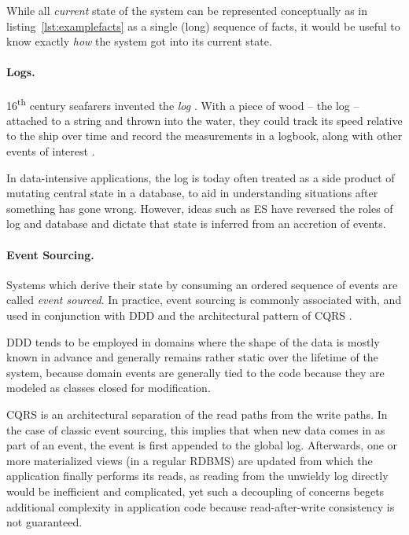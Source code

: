 While all \emph{current} state of the system can be represented conceptually as in listing~\ref{lst:examplefacts} as a single (long) sequence of facts, it would be useful to know exactly \emph{how} the system got into its current state.


\paragraph{Logs.} 16\textsuperscript{th} century seafarers invented the \emph{log} \cite{may1973historylog}. With a piece of wood -- the log -- attached to a string and thrown into the water, they could track its speed relative to the ship over time and record the measurements in a logbook, along with other events of interest \cite{kakkar19log}.

In data-intensive applications, the log is today often treated as a side product of mutating central state in a database, to aid in understanding situations after something has gone wrong. However, ideas such as \gls{ES} have reversed the roles of log and database and dictate that state is inferred from an accretion of events.

\cleardoublepage
\paragraph{Event Sourcing.} Systems which derive their state by consuming an ordered sequence of events are called \emph{event sourced}. In practice, event sourcing is commonly associated with, and used in conjunction with \gls{DDD} \cite{evans2004domain} and the architectural pattern of \gls{CQRS} \cite{kabbedijk2012case}.

DDD tends to be employed in domains where the shape of the data is mostly known in advance and generally remains rather static over the lifetime of the system, because domain events are generally tied to the code because they are modeled as classes closed for modification.

CQRS is an architectural separation of the read paths from the write paths. In the case of classic event sourcing, this implies that when new data comes in as part of an event, the event is first appended to the global log. Afterwards, one or more materialized views (in a regular RDBMS) are updated from which the application finally performs its reads, as reading from  the unwieldy log directly would be inefficient and complicated, yet such a decoupling of concerns begets additional complexity in application code because read-after-write consistency is not guaranteed.

